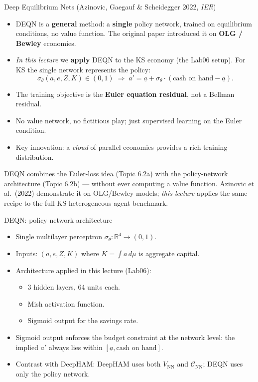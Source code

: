 \begin{frame}{Deep Equilibrium Nets (Azinovic, Gaegauf \& Scheidegger 2022, \emph{IER})}
\begin{itemize}
\item DEQN is a \textbf{general} method: a \textbf{single} policy network, trained on equilibrium conditions, no value function. The original paper introduced it on \textbf{OLG / Bewley} economies.
\medskip
\item \textit{In this lecture} we \textbf{apply} DEQN to the KS economy (the Lab06 setup). For KS the single network represents the policy:
\[
\sigma_\theta(a, e, Z, K) \in (0,1)
\;\Rightarrow\;
a' = \underline a + \sigma_\theta\cdot(\text{cash on hand} - \underline a).
\]
\medskip
\item The training objective is the \textbf{Euler equation residual}, not a Bellman residual.
\medskip
\item No value network, no fictitious play; just supervised learning on the Euler condition.
\medskip
\item Key innovation: a \emph{cloud} of parallel economies provides a rich training distribution.
\end{itemize}

\begin{tcolorbox}[colback=blue!3, colframe=blue!40, title={Why DEQN is the capstone of the deep-HA toolbox}]
\scriptsize DEQN combines the Euler-loss idea (Topic 6.2a) with the policy-network architecture (Topic 6.2b) --- without ever computing a value function. Azinovic et al.\ (2022) demonstrate it on OLG/Bewley models; \emph{this lecture} applies the same recipe to the full KS heterogeneous-agent benchmark.
\end{tcolorbox}
\end{frame}

\begin{frame}{DEQN: policy network architecture}
\begin{itemize}
\item Single multilayer perceptron $\sigma_\theta : \mathbb{R}^4 \to (0,1)$.
\medskip
\item Inputs: $(a, e, Z, K)$ where $K = \int a\, d\mu$ is aggregate capital.
\medskip
\item Architecture applied in this lecture (Lab06):
  \begin{itemize}
  \item 3 hidden layers, 64 units each.
  \item Mish activation function.
  \item Sigmoid output for the savings rate.
  \end{itemize}
\medskip
\item Sigmoid output enforces the budget constraint at the network level: the implied $a'$ always lies within $[\underline a, \text{cash on hand}]$.
\medskip
\item Contrast with DeepHAM: DeepHAM uses both $V_{\text{NN}}$ and $\mathcal C_{\text{NN}}$; DEQN uses only the policy network.
\end{itemize}
\end{frame}

